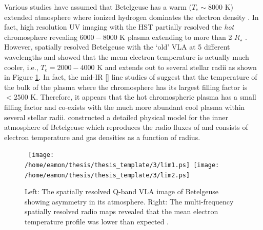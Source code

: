 Various studies have assumed that Betelgeuse has a warm ($T_e \sim 8000$ K) extended atmosphere where ionized hydrogen dominates the electron density \citep[e.g.,][]{newell_1982,hartmann_1984}. In fact, high resolution UV imaging with the HST partially resolved the \textit{hot} chromosphere revealing $6000-8000$ K plasma extending to more than 2 $R_{\star}$ \citep{gilliland_1996}. However, \cite{lim_1998} spatially resolved Betelgeuse with the `old' VLA at 5 different wavelengths and showed that the mean electron temperature is actually much cooler, i.e., $T_e = 2000 - 4000$ K and extends out to several stellar radii as shown in Figure \ref{fig3.1}. In fact, the mid-IR [] line studies of \cite{harper_2009} suggest that the temperature of the bulk of the plasma where the chromosphere has its largest filling factor is $< 2500$ K. Therefore, it appears that the hot chromospheric plasma has a small filling factor and co-exists with the much more abundant cool plasma within several stellar radii. \cite{harper_2001} constructed a detailed physical model for the inner atmosphere of Betelgeuse which reproduces the radio fluxes of \cite{lim_1998} and consists of electron temperature and gas densities as a function of radius.

\begin{figure}[hbt!]
\centering 
\mbox{
          \texttt{[image: /home/eamon/thesis/thesis\_template/3/lim1.ps]}
          \texttt{[image: /home/eamon/thesis/thesis\_template/3/lim2.ps]}
          }
\caption[VLA spatially resolved analysis of Betelgeuse.]{Left: The spatially resolved Q-band VLA image of Betelgeuse showing asymmetry in its atmosphere. Right: The multi-frequency spatially resolved radio maps revealed that the mean electron temperature profile was lower than expected \citep{lim_1998}.}
\label{fig3.1}
\end{figure}

